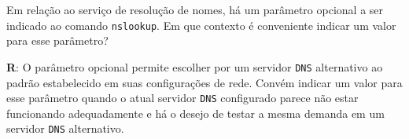 Em relação ao serviço de resolução de nomes, há um parâmetro opcional a ser indicado ao comando \texttt{nslookup}. Em que contexto é conveniente indicar um valor para esse parâmetro?

\textbf{R}: O parâmetro opcional permite escolher por um servidor \texttt{DNS} alternativo ao padrão estabelecido em suas configurações de rede. Convém indicar um valor para esse parâmetro quando o atual servidor \texttt{DNS} configurado parece não estar funcionando adequadamente e há o desejo de testar a mesma demanda em um servidor \texttt{DNS} alternativo.
